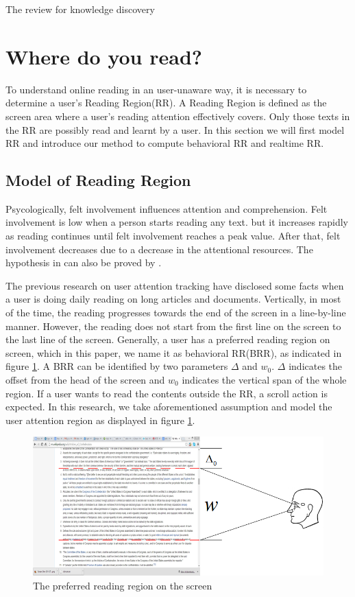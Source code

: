 \documentclass{sigchi}
\begin{document}
The review for knowledge discovery 




\section{Where do you read?}
To understand  online reading in an user-unaware way, it is necessary to determine a user's Reading Region(RR). A Reading Region is defined as
the screen area where a user's reading attention effectively covers. Only those texts in the  RR are possibly read and learnt by a user. In this section we 
will first model RR and introduce our method to compute behavioral RR and realtime RR.

\subsection{Model of Reading Region}
Psycologically, felt involvement\cite{celsi1988role} influences attention and comprehension.  Felt involvement is low when a person starts reading any text. 
but it increases rapidly as reading continues until felt involvement reaches a peak value. After that, felt involvement decreases due to a decrease in the attentional
resources. The hypothesis in  \cite{celsi1988role} can also be proved by \cite{buscher2010eye}. 

The previous research on user attention tracking \cite{buscher2010eye} have disclosed some facts when a user is doing daily reading on 
long articles and documents. Vertically, in most of the time, the reading progresses towards the end of the screen  in a line-by-line manner. 
However, the reading does not start from the first line on the screen to the last line of the screen. Generally, a user has a preferred reading region on screen, which in this paper, 
we name it as behavioral RR(BRR), as indicated in figure \ref{fig:read_region}. A BRR can be identified by two parameters $\Delta$ and $w_0$. $\Delta$  indicates the 
offset from the head of the screen and $w_0$ indicates the vertical span of the whole region. If a user wants to read the contents outside the RR,
a scroll action is expected. In this research, we take aforementioned assumption and model the user attention region as displayed in figure \ref{fig:read_region}. 


\begin{figure}[!h] 
\centering
\includegraphics[width=1.0\columnwidth]{pictures/preferred_reigon}
\caption{The preferred reading region on the screen}
\label{fig:read_region}
\end{figure}
\end{document}
